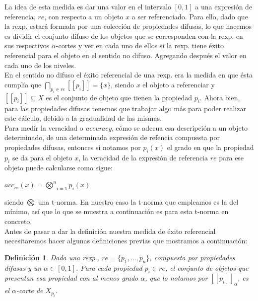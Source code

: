 \documentclass[10pt,a4paper]{article}
\newtheorem{definicion}{Definición}
\begin{document}
La idea de esta medida es dar una valor en el intervalo $[0,1]$ a una expresión de referencia, $re$, con respecto a un objeto $x$ a ser referenciado. Para ello, dado que la rexp. estará formada por una colección de propiedades difusas, lo que hacemos es dividir el conjunto difuso de los objetos que se corresponden con la rexp. en sus respectivos $\alpha$-cortes y ver en cada uno de ellos si la rexp. tiene éxito referencial para el objeto en el sentido no difuso. Agregando después el valor en cada uno de los niveles.\\

En el sentido no difuso el éxito referencial de una rexp. era la medida en que ésta cumplía que $\underset{p_i \in re}{\bigcap}[[p_i]] = \lbrace x \rbrace$, siendo $x$ el objeto a referenciar y $[[p_i]] \subseteq X$ es el conjunto de objeto que tienen la propiedad $p_i$. Ahora bien, para las propiedades difusas tenemos que trabajar algo más para poder realizar este cálculo, debido a la gradualidad de las mismas.\\

Para medir la veracidad o \textit{accuracy}, cómo se adecua esa descripción a un objeto determinado, de una determinada expresión de refencia compuesta por propiedades difusas, entonces si notamos por $p_i(x)$ el grado en que la propiedad $p_i$ se da para el objeto $x$, la veracidad de la expresión de referencia $re$ para ese objeto puede calcularse como sigue:

\begin{center}
$acc_{re}(x) = \underset{i = 1}{\overset{n}{\bigotimes}} p_i(x)$
\end{center}

siendo $\bigotimes$ una t-norma. En nuestro caso la t-norma que empleamos es la del mínimo, así que lo que se muestra a continuación es para esta t-norma en concreto.\\

Antes de pasar a dar la definición nuestra medida de éxito referencial necesitaremos hacer algunas definiciones previas que mostramos a continuación:

\begin{definicion}
Dada una rexp., $re = \lbrace p_1, ..., p_n\rbrace$, compuesta por propiedades difusas y un $\alpha \in [0,1]$. Para cada propiedad $p_i \in re$, el conjunto de objetos que presentan esa propiedad con al menos grado $\alpha$, que lo notamos por $[[p_i]]_\alpha$, es el $\alpha$-corte de $X_{p_i}$.
\end{definicion}
\end{document}
